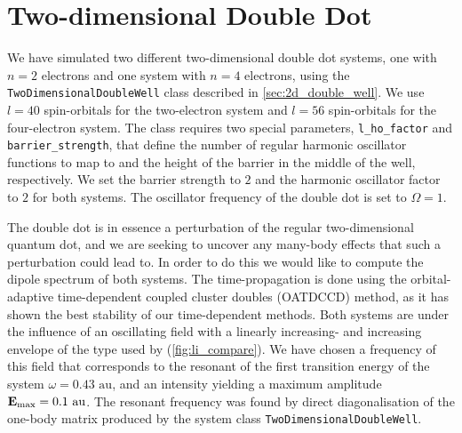 \section{Two-dimensional Double Dot}

We have simulated two different two-dimensional double dot systems, one with $n=2$ electrons 
and 
one system with $n=4$ electrons, using the \lstinline{TwoDimensionalDoubleWell} class described
in \autoref{sec:2d_double_well}. We use $l=40$ spin-orbitals for the two-electron system 
and $l=56$ spin-orbitals for the four-electron system. The class requires two special parameters, 
\lstinline{l_ho_factor} and \lstinline{barrier_strength}, that define the 
number of regular harmonic oscillator functions to map to and the height of the 
barrier in the middle of the well, respectively. We set the barrier strength to $2$ 
and the harmonic oscillator factor to $2$ for both systems. The oscillator frequency 
of the double dot is set to $\Omega=1$.

The double dot is in essence a perturbation of the regular two-dimensional quantum dot, and we are seeking to uncover any many-body 
effects that such a perturbation could lead to. In order to do this we would like to 
compute the dipole spectrum of both systems. The time-propagation is done using the 
orbital-adaptive time-dependent coupled cluster doubles (OATDCCD) method, as it has shown 
the best stability of our time-dependent methods. Both systems are under the influence of an 
oscillating field with a linearly increasing- and increasing envelope of the type used by 
\citeauthor{li2005time}\cite{li2005time} (\autoref{fig:li_compare}). We have chosen a 
frequency of this field that corresponds to the resonant of the first transition energy 
of the system $\omega = 0.43 \text{ au}$, and an intensity yielding a maximum amplitude
$\vb{E}_\text{max} = 0.1 \text{ au}$. The resonant frequency was found by direct diagonalisation 
of the one-body matrix produced by the system class \lstinline{TwoDimensionalDoubleWell}.

